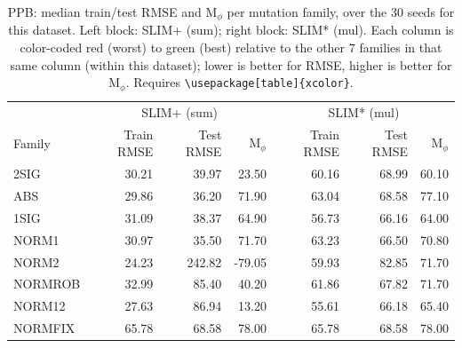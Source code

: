\begin{table}[t]
\centering
\caption{PPB: median train/test RMSE and M$_\phi$ per mutation family, over the 30 seeds for this dataset. Left block: SLIM+ (sum); right block: SLIM* (mul). Each column is color-coded red (worst) to green (best) relative to the other 7 families in that same column (within this dataset); lower is better for RMSE, higher is better for M$_\phi$. Requires \texttt{\textbackslash usepackage[table]\{xcolor\}}.}
\label{tab:summary-median-performance-ppb}
\begin{tabular}{lrrr|rrr}
\toprule
& \multicolumn{3}{c|}{SLIM+ (sum)} & \multicolumn{3}{c}{SLIM* (mul)} \\
Family & Train RMSE & Test RMSE & M$_\phi$ & Train RMSE & Test RMSE & M$_\phi$ \\
\midrule
2SIG & \cellcolor[HTML]{C6E3AE}30.21 & \cellcolor[HTML]{B2DCB0}39.97 & \cellcolor[HTML]{E6EEAA}23.50 & \cellcolor[HTML]{F6F3A8}60.16 & \cellcolor[HTML]{CAE4AD}68.99 & \cellcolor[HTML]{FAAAA5}60.10 \\
ABS & \cellcolor[HTML]{C4E2AE}29.86 & \cellcolor[HTML]{AFDBB0}36.20 & \cellcolor[HTML]{B5DDB0}71.90 & \cellcolor[HTML]{FDD3A6}63.04 & \cellcolor[HTML]{C6E3AE}68.58 & \cellcolor[HTML]{B7DEAF}77.10 \\
1SIG & \cellcolor[HTML]{C9E4AD}31.09 & \cellcolor[HTML]{B1DCB0}38.37 & \cellcolor[HTML]{BCE0AF}64.90 & \cellcolor[HTML]{C0E1AE}56.73 & \cellcolor[HTML]{AEDBB0}66.16 & \cellcolor[HTML]{FCCBA6}64.00 \\
NORM1 & \cellcolor[HTML]{C9E4AD}30.97 & \cellcolor[HTML]{AEDBB0}35.50 & \cellcolor[HTML]{B5DDAF}71.70 & \cellcolor[HTML]{FDD0A6}63.23 & \cellcolor[HTML]{B2DCB0}66.50 & \cellcolor[HTML]{EFF1A9}70.80 \\
NORM2 & \cellcolor[HTML]{AEDBB0}24.23 & \cellcolor[HTML]{FAAAA5}242.82 & \cellcolor[HTML]{FAAAA5}-79.05 & \cellcolor[HTML]{F3F2A8}59.93 & \cellcolor[HTML]{FAAAA5}82.85 & \cellcolor[HTML]{E7EEAA}71.70 \\
NORMROB & \cellcolor[HTML]{D0E6AC}32.99 & \cellcolor[HTML]{D5E8AC}85.40 & \cellcolor[HTML]{D5E8AC}40.20 & \cellcolor[HTML]{FEE5A6}61.86 & \cellcolor[HTML]{BEE0AE}67.82 & \cellcolor[HTML]{E7EEAA}71.70 \\
NORM12 & \cellcolor[HTML]{BCDFAF}27.63 & \cellcolor[HTML]{D6E8AC}86.94 & \cellcolor[HTML]{F1F1A8}13.20 & \cellcolor[HTML]{AEDBB0}55.61 & \cellcolor[HTML]{AFDBB0}66.18 & \cellcolor[HTML]{FDD7A6}65.40 \\
NORMFIX & \cellcolor[HTML]{FAAAA5}65.78 & \cellcolor[HTML]{C8E4AD}68.58 & \cellcolor[HTML]{AEDBB0}78.00 & \cellcolor[HTML]{FAAAA5}65.78 & \cellcolor[HTML]{C6E3AE}68.58 & \cellcolor[HTML]{AEDBB0}78.00 \\
\bottomrule
\end{tabular}
\end{table}


